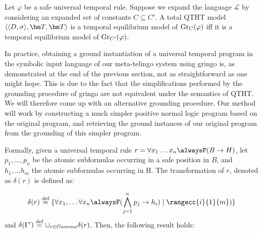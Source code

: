 \begin{theorem}\label{theorem:domain-independence}
  Let $\varphi$ be a safe universal temporal rule. Suppose we expand
  the language $\mathcal{L}$ by considering an expanded set of
  constants $C \subseteq C'$. A total QTHT model $\qttandt$ is a
  temporal equilibrium model of $\operatorname{Gr}_{C}(\varphi)$ iff it is a
  temporal equilibrium model of $\operatorname{Gr}_{C'}(\varphi)$.
\end{theorem}

In practice, obtaining a ground instantiation of a universal temporal
program in the symbolic input language of our meta-telingo system
using gringo is, as demonstrated at the end of the previous section,
not as straightforward as one might hope. This is due to the fact that
the simplifications performed by the grounding procedure of gringo are
not equivalent under the semantics of QTHT. We will therefore come up
with an alternative grounding procedure. Our method will work by
constructing a much simpler positive normal logic program based on the
original program, and retrieving the ground instances of our original
program from the grounding of this simpler program.



Formally, given a universal temporal rule
$r=\forall x_1 \dots x_n \alwaysF(B \rightarrow H)$, let
$p_1,\dots, p_n$ be the atomic subformulas occurring in a safe
position in $B$, and $h_1, \dots h_m$ the atomic subformulas occurring
in H. The transformation of $r$, denoted as $\delta(r)$ is defined as:

\begin{equation*} \delta(r) \defeq \{ \forall x_1, \dots \forall x_n
\alwaysF(\bigwedge_{j=1}^{n}p_j \rightarrow h_i) \mid
\rangecc{i}{1}{m})\}
\end{equation*}
and $\delta (\Gamma^{\prime}) \stackrel{\text{def}}{=} \cup_{r \in Gamma}
\delta(r)$. Then, the following result holds:

